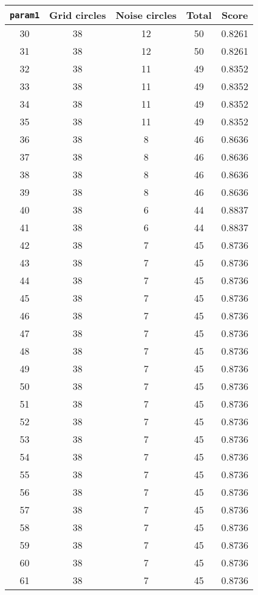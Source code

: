 \documentclass[letterpaper, 12pt]{article}
\begin{document}
\begin{longtable}{|c|c|c|c|c|}
\hline
\textbf{\texttt{param1}} & \textbf{Grid circles} & \textbf{Noise circles} & \textbf{Total} & \textbf{Score} \\
\hline
30 & 38 & 12 & 50 & 0.8261 \\
\hline
31 & 38 & 12 & 50 & 0.8261 \\
\hline
32 & 38 & 11 & 49 & 0.8352 \\
\hline
33 & 38 & 11 & 49 & 0.8352 \\
\hline
34 & 38 & 11 & 49 & 0.8352 \\
\hline
35 & 38 & 11 & 49 & 0.8352 \\
\hline
36 & 38 & 8 & 46 & 0.8636 \\
\hline
37 & 38 & 8 & 46 & 0.8636 \\
\hline
38 & 38 & 8 & 46 & 0.8636 \\
\hline
39 & 38 & 8 & 46 & 0.8636 \\
\hline
40 & 38 & 6 & 44 & 0.8837 \\
\hline
41 & 38 & 6 & 44 & 0.8837 \\
\hline
42 & 38 & 7 & 45 & 0.8736 \\
\hline
43 & 38 & 7 & 45 & 0.8736 \\
\hline
44 & 38 & 7 & 45 & 0.8736 \\
\hline
45 & 38 & 7 & 45 & 0.8736 \\
\hline
46 & 38 & 7 & 45 & 0.8736 \\
\hline
47 & 38 & 7 & 45 & 0.8736 \\
\hline
48 & 38 & 7 & 45 & 0.8736 \\
\hline
49 & 38 & 7 & 45 & 0.8736 \\
\hline
50 & 38 & 7 & 45 & 0.8736 \\
\hline
51 & 38 & 7 & 45 & 0.8736 \\
\hline
52 & 38 & 7 & 45 & 0.8736 \\
\hline
53 & 38 & 7 & 45 & 0.8736 \\
\hline
54 & 38 & 7 & 45 & 0.8736 \\
\hline
55 & 38 & 7 & 45 & 0.8736 \\
\hline
56 & 38 & 7 & 45 & 0.8736 \\
\hline
57 & 38 & 7 & 45 & 0.8736 \\
\hline
58 & 38 & 7 & 45 & 0.8736 \\
\hline
59 & 38 & 7 & 45 & 0.8736 \\
\hline
60 & 38 & 7 & 45 & 0.8736 \\
\hline
61 & 38 & 7 & 45 & 0.8736 \\

\end{longtable}
\end{document}
